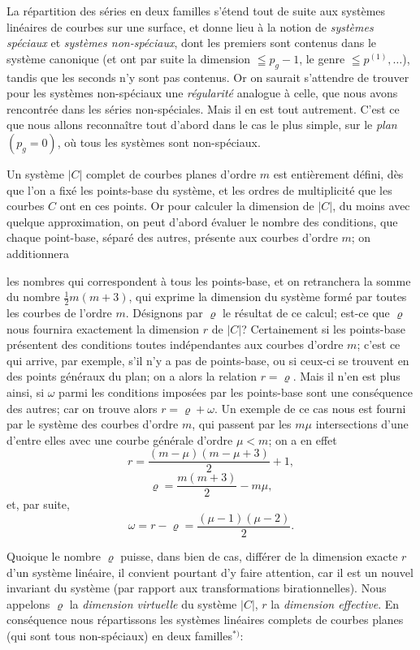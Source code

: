 \documentclass{article}
\begin{document}
La répartition des séries en deux familles s'étend tout de suite aux systèmes linéaires de courbes sur une surface, et donne lieu à la notion de \emph{systèmes spéciaux} et \emph{systèmes non-spéciaux}, dont les premiers sont contenus dans le système canonique (et ont par suite la dimension $\leqq p_{g} - 1$, le genre $\leqq p^{(1)}, \ldots$), tandis que les seconds n'y sont pas contenus. Or on saurait s'attendre de trouver pour les systèmes non-spéciaux une \emph{régularité} analogue à celle, que nous avons rencontrée dans les séries non-spéciales. Mais il en est tout autrement. C'est ce que nous allons reconnaître tout d'abord dans le cas le plus simple, sur le \emph{plan} $(p_{g} = 0)$, où tous les systèmes sont non-spéciaux.

Un système $|C|$ complet de courbes planes d'ordre $m$ est entièrement défini, dès que l'on a fixé les points-base du système, et les ordres de multiplicité que les courbes $C$ ont en ces points. Or pour calculer la dimension de $|C|$, du moins avec quelque approximation, on peut d'abord évaluer le nombre des conditions, que chaque point-base, séparé des autres, présente aux courbes d'ordre $m$; on additionnera

les nombres qui correspondent à tous les points-base, et on retranchera la somme du nombre $\frac{1}{2} m(m+3)$, qui exprime la dimension du système formé par toutes les courbes de l'ordre $m$. Désignons par $\varrho$ le résultat de ce calcul; est-ce que $\varrho$ nous fournira exactement la dimension $r$ de $|C|$? Certainement si les points-base présentent des conditions toutes indépendantes aux courbes d'ordre $m$; c'est ce qui arrive, par exemple, s'il n'y a pas de points-base, ou si ceux-ci se trouvent en des points généraux du plan; on a alors la relation $r = \varrho$. Mais il n'en est plus ainsi, si $\omega$ parmi les conditions imposées par les points-base sont une conséquence des autres; car on trouve alors $r = \varrho + \omega$. Un exemple de ce cas nous est fourni par le système des courbes d'ordre $m$, qui passent par les $m\mu$ intersections d'une d'entre elles avec une courbe générale d'ordre $\mu < m$; on a en effet
\[ r = \frac{(m-\mu)(m-\mu+3)}{2} + 1, \]
\[ \varrho = \frac{m(m+3)}{2} - m\mu, \]
et, par suite,
\[ \omega = r - \varrho = \frac{(\mu-1)(\mu-2)}{2}. \]

Quoique le nombre $\varrho$ puisse, dans bien de cas, différer de la dimension exacte $r$ d'un système linéaire, il convient pourtant d'y faire attention, car il est un nouvel invariant du système (par rapport aux transformations birationnelles). Nous appelons $\varrho$ la \emph{dimension virtuelle} du système $|C|$, $r$ la \emph{dimension effective}. En conséquence nous répartissons les systèmes linéaires complets de courbes planes (qui sont tous non-spéciaux) en deux familles${}^{*)}$:
\end{document}
